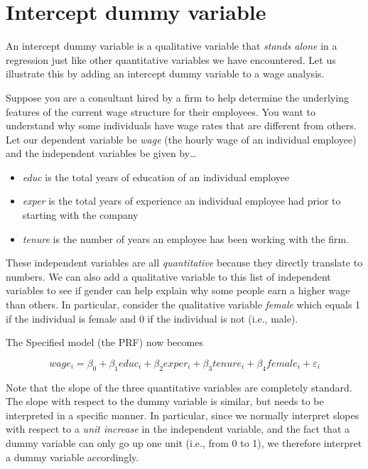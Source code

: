 \documentclass[
]{book}
\begin{document}
\hypertarget{intercept-dummy-variable}{%
\section{Intercept dummy variable}\label{intercept-dummy-variable}}

An intercept dummy variable is a qualitative variable that \emph{stands alone} in a regression just like other quantitative variables we have encountered. Let us illustrate this by adding an intercept dummy variable to a wage analysis.

Suppose you are a consultant hired by a firm to help determine the underlying features of the current wage structure for their employees. You want to understand why some individuals have wage rates that are different from others. Let our dependent variable be \emph{wage} (the hourly wage of an individual employee) and the independent variables be given by\ldots{}

\begin{itemize}
\item
  \emph{educ} is the total years of education of an individual employee
\item
  \emph{exper} is the total years of experience an individual employee had prior to starting with the company
\item
  \emph{tenure} is the number of years an employee has been working with the firm.
\end{itemize}

These independent variables are all \emph{quantitative} because they directly translate to numbers. We can also add a qualitative variable to this list of independent variables to see if gender can help explain why some people earn a higher wage than others. In particular, consider the qualitative variable \emph{female} which equals 1 if the individual is female and 0 if the individual is not (i.e., male).

The Specified model (the PRF) now becomes

\[wage_i=\beta_0+\beta_1educ_i+\beta_2exper_i+\beta_3tenure_i+\beta_4female_i+\varepsilon_i\]

Note that the slope of the three quantitative variables are completely standard. The slope with respect to the dummy variable is similar, but needs to be interpreted in a specific manner. In particular, since we normally interpret slopes with respect to a \emph{unit increase} in the independent variable, and the fact that a dummy variable can only go up one unit (i.e., from 0 to 1), we therefore interpret a dummy variable accordingly.
\end{document}

